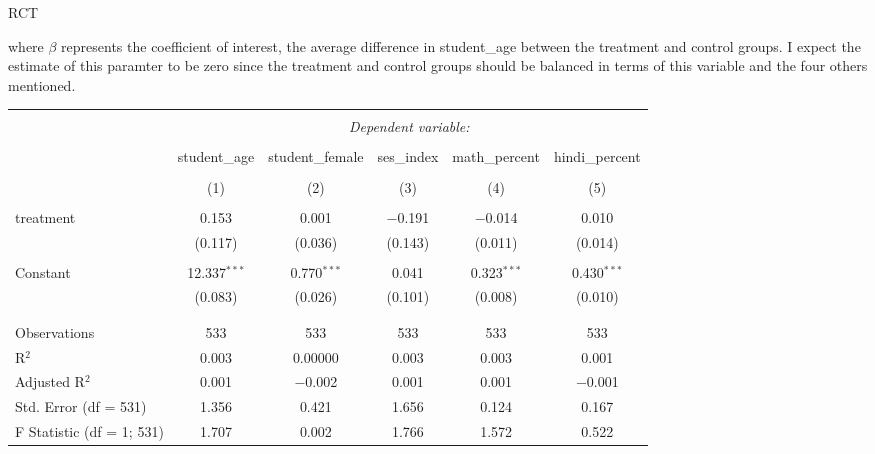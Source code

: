 \begin{homeworkProblem}{RCT}
\begin{solution}
\begin{enumerate}
                where $\beta$ represents the coefficient of interest, the
                average difference in student\_age between the treatment and 
                control groups. I expect the estimate of this paramter to be 
                zero since the treatment and control groups should be balanced
                in terms of this variable and the four others mentioned. 
                
            
                \begin{table}[!htbp] \centering 
                    \begin{tabular}{@{\extracolsep{5pt}}lccccc} 
                    \\[-1.8ex]\hline 
                    \hline \\[-1.8ex] 
                    & \multicolumn{5}{c}{\textit{Dependent variable:}} \\ 
                    \cline{2-6} 
                    \\[-1.8ex] & student\_age & student\_female & ses\_index & math\_percent & hindi\_percent \\ 
                    \\[-1.8ex] & (1) & (2) & (3) & (4) & (5)\\ 
                    \hline \\[-1.8ex] 
                    treatment & 0.153 & 0.001 & $-$0.191 & $-$0.014 & 0.010 \\ 
                    & (0.117) & (0.036) & (0.143) & (0.011) & (0.014) \\ 
                    & & & & & \\ 
                    Constant & 12.337$^{***}$ & 0.770$^{***}$ & 0.041 & 0.323$^{***}$ & 0.430$^{***}$ \\ 
                    & (0.083) & (0.026) & (0.101) & (0.008) & (0.010) \\ 
                    & & & & & \\ 
                    \hline \\[-1.8ex] 
                    Observations & 533 & 533 & 533 & 533 & 533 \\ 
                    R$^{2}$ & 0.003 & 0.00000 & 0.003 & 0.003 & 0.001 \\ 
                    Adjusted R$^{2}$ & 0.001 & $-$0.002 & 0.001 & 0.001 & $-$0.001 \\ 
                    Std. Error (df = 531) & 1.356 & 0.421 & 1.656 & 0.124 & 0.167 \\ 
                    F Statistic (df = 1; 531) & 1.707 & 0.002 & 1.766 & 1.572 & 0.522 \\ 

\end{tabular}
\end{table}
\end{enumerate}
\end{solution}
\end{homeworkProblem}
